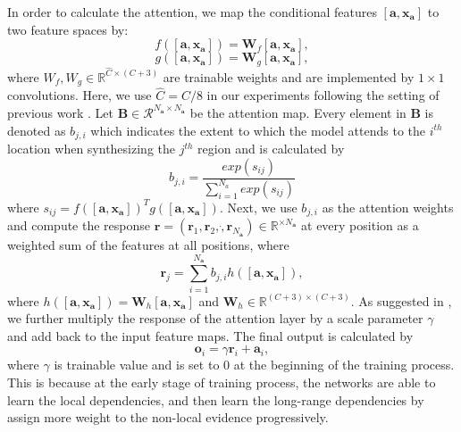 In order to calculate the attention, we map the conditional features $[\bm{a}, \bm{x}_{\bm{a}}]$ to two feature spaces by:
\begin{equation}
\label{eqn:f}
f([\bm{a}, \bm{x}_{\bm{a}} ])=\mathbf{W}_f[\bm{a}, \bm{x}_{\bm{a}} ],
\end{equation}
\begin{equation}
\label{eqn:g}
g([\bm{a}, \bm{x}_{\bm{a}} ])=\mathbf{W}_g[\bm{a}, \bm{x}_{\bm{a}} ],
\end{equation}
where $W_f, W_g\in \mathbb{R}^{\hat{C}\times (C+3)}$ are trainable weights and are implemented by $1\times 1$ convolutions. Here, we use $\hat{C}=C/8$ in our experiments following the setting of previous work \cite{SAGANs}.
%
Let $\mathbf{B}\in \mathcal{R}^{N_{\bm{a}}\times N_{\bm{a}}}$ be the attention map. Every element in $\mathbf{B}$ is denoted as $b_{j,i}$ which indicates the extent to which the model attends to the $i^{th}$ location when synthesizing the $j^{th}$ region and is calculated by 
\begin{equation}
\label{eqn:beta}
b_{j,i}=\frac{exp(s_{ij})}{\sum^{N_a}_{i=1}exp(s_{ij})}
\end{equation}
where $s_{ij}=f([\bm{a}, \bm{x}_{\bm{a}} ])^Tg([\bm{a}, \bm{x}_{\bm{a}} ])$. Next, we use $b_{j,i}$ as the attention weights and compute the response $\bm{r}=(\bm{r}_1, \bm{r}_2,\dot, \bm{r}_{N_{\bm{a}}})\in \mathbb{R}^{\times N_{\bm{a}}}$ at every position as a weighted sum of the features at all positions, where
\begin{equation}
\label{eqn:response}
\bm{r}_j=\sum^{N_{\bm{a}}}_{i=1}b_{j,i}h([\bm{a}, \bm{x}_{\bm{a}} ]),
\end{equation}
where $h([\bm{a}, \bm{x}_{\bm{a}}])=\mathbf{W}_h[\bm{a}, \bm{x}_{\bm{a}} ]$ and $\mathbf{W}_h\in \mathbb{R}^{(C+3)\times (C+3)}$.
As suggested in \cite{SAGANs}, we further multiply the response of the attention layer by a scale parameter $\gamma$ and add back to the input feature maps. The final output is calculated by 
\begin{equation}
\label{eqn:output}
\bm{o}_i=\gamma \bm{r}_i+\bm{a}_i,
\end{equation}
where $\gamma$ is trainable value and is set to $0$ at the beginning of the training process. This is because at the early stage of training process, the networks are able to learn the local dependencies, and then learn the long-range dependencies by assign more weight to the non-local evidence progressively.
%
%
